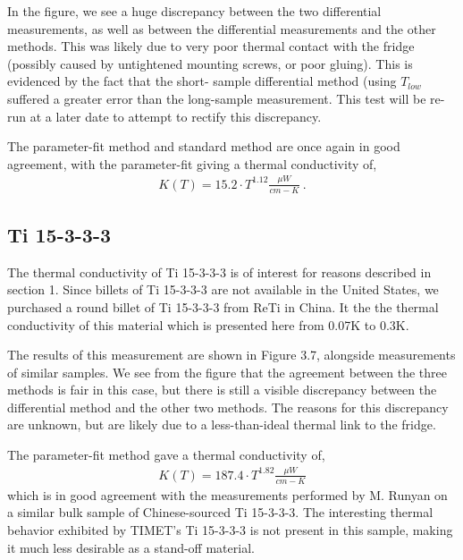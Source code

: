 \documentclass{report}
\begin{document}
In the figure, we see a huge discrepancy between the two differential measurements, as well as between the differential measurements and the other methods. This was likely due to very poor thermal contact with the fridge (possibly caused by untightened mounting screws, or poor gluing). This is evidenced by the fact that the short- sample differential method (using $T_{low}$ suffered a greater error than the long-sample measurement. This test will be re-run at a later date to attempt to rectify this discrepancy.

The parameter-fit method and standard method are once again in good agreement, with the parameter-fit giving a thermal conductivity of,
\begin{eqnarray}
K(T) = 15.2 \cdot T^{1.12} \frac{\mu W}{cm-K} \ .
\end{eqnarray}

\subsection{Ti 15-3-3-3}
The thermal conductivity of Ti 15-3-3-3 is of interest for reasons described in section 1. Since billets of Ti 15-3-3-3 are not available in the United States, we purchased a round billet of Ti 15-3-3-3 from ReTi in China. It the the thermal conductivity of this material which is presented here from 0.07K to 0.3K.

The results of this measurement are shown in Figure 3.7, alongside measurements of similar samples. We see from the figure that the agreement between the three methods is fair in this case, but there is still a visible discrepancy between the differential method and the other two methods. The reasons for this discrepancy are unknown, but are likely due to a less-than-ideal thermal link to the fridge.

The parameter-fit method gave a thermal conductivity of,
\begin{eqnarray}
K(T) = 187.4 \cdot T^{1.82} \frac{\mu W}{cm-K}
\end{eqnarray}
which is in good agreement with the measurements performed by M. Runyan on a similar bulk sample of Chinese-sourced Ti 15-3-3-3. The interesting thermal behavior exhibited by TIMET's Ti 15-3-3-3 is not present in this sample, making it much less desirable as a stand-off material.\footnotemark

\end{document}
